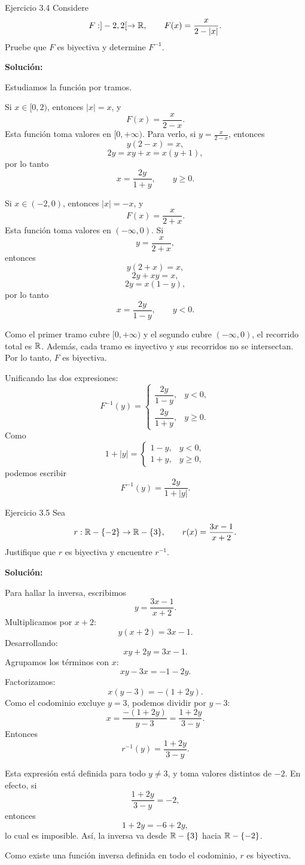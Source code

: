 \documentclass[letterpaper, 12pt]{article}
\begin{document}
\begin{solucionbox}{Ejercicio 3.4}
Considere
\[
    F:]-2,2[\to\mathbb{R},
    \qquad
    F(x)=\frac{x}{2-|x|}.
\]
Pruebe que $F$ es biyectiva y determine $F^{-1}$.

\textbf{Soluci\'on:}

Estudiamos la funci\'on por tramos.

Si $x\in[0,2)$, entonces $|x|=x$, y
\[
    F(x)=\frac{x}{2-x}.
\]
Esta funci\'on toma valores en $[0,+\infty)$. Para verlo, si $y=\frac{x}{2-x}$, entonces
\[
    y(2-x)=x,
\]
\[
    2y=xy+x=x(y+1),
\]
por lo tanto
\[
    x=\frac{2y}{1+y},\qquad y\geq 0.
\]

Si $x\in(-2,0)$, entonces $|x|=-x$, y
\[
    F(x)=\frac{x}{2+x}.
\]
Esta funci\'on toma valores en $(-\infty,0)$. Si
\[
    y=\frac{x}{2+x},
\]
entonces
\[
    y(2+x)=x,
\]
\[
    2y+xy=x,
\]
\[
    2y=x(1-y),
\]
por lo tanto
\[
    x=\frac{2y}{1-y},\qquad y<0.
\]

Como el primer tramo cubre $[0,+\infty)$ y el segundo cubre $(-\infty,0)$, el recorrido total es $\mathbb{R}$. Adem\'as, cada tramo es inyectivo y sus recorridos no se intersectan. Por lo tanto, $F$ es biyectiva.

Unificando las dos expresiones:
\[
    F^{-1}(y)=
    \begin{cases}
        \dfrac{2y}{1-y}, & y<0,\\[1ex]
        \dfrac{2y}{1+y}, & y\geq 0.
    \end{cases}
\]
Como
\[
    1+|y|=
    \begin{cases}
        1-y, & y<0,\\
        1+y, & y\geq 0,
    \end{cases}
\]
podemos escribir
\[
    F^{-1}(y)=\frac{2y}{1+|y|}.
\]

\respuesta{$F$ es biyectiva y $F^{-1}(y)=\dfrac{2y}{1+|y|}$, con $F^{-1}:\R\to]-2,2[$.}
\end{solucionbox}

\begin{solucionbox}{Ejercicio 3.5}
Sea
\[
    r:\mathbb{R}-\{-2\}\to\mathbb{R}-\{3\},
    \qquad
    r(x)=\frac{3x-1}{x+2}.
\]
Justifique que $r$ es biyectiva y encuentre $r^{-1}$.

\textbf{Soluci\'on:}

Para hallar la inversa, escribimos
\[
    y=\frac{3x-1}{x+2}.
\]
Multiplicamos por $x+2$:
\[
    y(x+2)=3x-1.
\]
Desarrollando:
\[
    xy+2y=3x-1.
\]
Agrupamos los t\'erminos con $x$:
\[
    xy-3x=-1-2y.
\]
Factorizamos:
\[
    x(y-3)=-(1+2y).
\]
Como el codominio excluye $y=3$, podemos dividir por $y-3$:
\[
    x=\frac{-(1+2y)}{y-3}
     =\frac{1+2y}{3-y}.
\]
Entonces
\[
    r^{-1}(y)=\frac{1+2y}{3-y}.
\]

Esta expresi\'on est\'a definida para todo $y\neq 3$, y toma valores distintos de $-2$. En efecto, si
\[
    \frac{1+2y}{3-y}=-2,
\]
entonces
\[
    1+2y=-6+2y,
\]
lo cual es imposible. As\'i, la inversa va desde $\mathbb{R}-\{3\}$ hacia $\mathbb{R}-\{-2\}$.

Como existe una funci\'on inversa definida en todo el codominio, $r$ es biyectiva.

\end{solucionbox}
\end{document}
